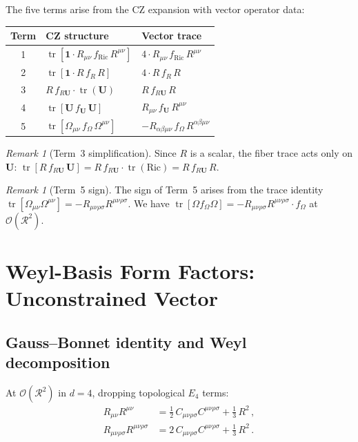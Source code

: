 \documentclass[11pt,a4paper]{article}
\newcommand{\Id}{\mathbf{1}}
\newcommand{\tr}{\operatorname{tr}}
\newcommand{\Ricsq}{R_{\mu\nu}R^{\mu\nu}}
\newcommand{\Rsq}{R_{\mu\nu\rho\sigma}R^{\mu\nu\rho\sigma}}
\newcommand{\Weylsq}{C_{\mu\nu\rho\sigma}C^{\mu\nu\rho\sigma}}
\theoremstyle{definition}
\theoremstyle{remark}
\newtheorem{remark}[theorem]{Remark}
\begin{document}
The five terms arise from the CZ expansion with vector operator data:
\begin{center}
\renewcommand{\arraystretch}{1.3}
\begin{tabular}{cll}
\toprule
\textbf{Term} & \textbf{CZ structure} & \textbf{Vector trace} \\
\midrule
1 & $\tr[\Id\cdot R_{\mu\nu}\,f_{\mathrm{Ric}}\,R^{\mu\nu}]$
  & $4\cdot R_{\mu\nu}\,f_{\mathrm{Ric}}\,R^{\mu\nu}$ \\
2 & $\tr[\Id\cdot R\,f_R\,R]$
  & $4\cdot R\,f_R\,R$ \\
3 & $R\,f_{R\mathbf{U}}\cdot\tr(\mathbf{U})$
  & $R\,f_{R\mathbf{U}}\,R$ \\
4 & $\tr[\mathbf{U}\,f_{\mathbf{U}}\,\mathbf{U}]$
  & $R_{\mu\nu}\,f_{\mathbf{U}}\,R^{\mu\nu}$ \\
5 & $\tr[\Omega_{\mu\nu}\,f_\Omega\,\Omega^{\mu\nu}]$
  & $-R_{\alpha\beta\mu\nu}\,f_\Omega\,R^{\alpha\beta\mu\nu}$ \\
\bottomrule
\end{tabular}
\end{center}

\begin{remark}[Term~3 simplification]
Since $R$ is a scalar, the fiber trace acts only on
$\mathbf{U}$: $\tr[R\,f_{R\mathbf{U}}\,\mathbf{U}]
= R\,f_{R\mathbf{U}}\cdot\tr(\mathrm{Ric})
= R\,f_{R\mathbf{U}}\,R$.
\end{remark}

\begin{remark}[Term~5 sign]
The sign of Term~5 arises from the trace identity
$\tr[\Omega_{\mu\nu}\Omega^{\mu\nu}] = -\Rsq$.
We have $\tr[\Omega f_\Omega \Omega]
= -\Rsq \cdot f_\Omega$ at $\mathcal{O}(\mathcal{R}^2)$.
\end{remark}


\section{Weyl-Basis Form Factors: Unconstrained Vector}
\label{sec:weyl-unconstr}

\subsection{Gauss--Bonnet identity and Weyl decomposition}

At $\mathcal{O}(\mathcal{R}^2)$ in $d = 4$, dropping topological
$E_4$ terms:
\begin{align}
  \Ricsq &= \frac{1}{2}\,\Weylsq + \frac{1}{3}\,R^2\,,
  \label{eq:weyl-decomp-Ric}\\
  \Rsq &= 2\,\Weylsq + \frac{1}{3}\,R^2\,.
  \label{eq:weyl-decomp-Riem}
\end{align}
\end{document}
